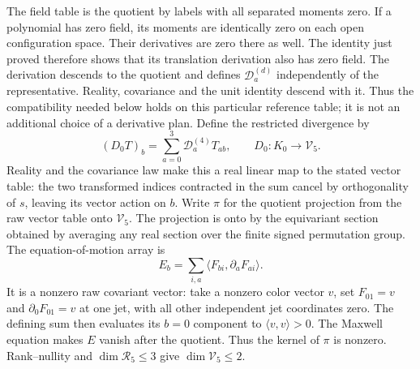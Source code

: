 The field table is the quotient by labels with all separated moments
zero. If a polynomial has zero field, its moments are identically zero
on each open configuration space. Their derivatives are zero there as
well. The identity just proved therefore shows that its translation
derivation also has zero field. The derivation descends to the quotient
and defines $\mathscr D_a^{(d)}$ independently of the representative.
Reality, covariance and the unit identity descend with it. Thus the
compatibility needed below holds on this particular reference table;
it is not an additional choice of a derivative plan. Define the restricted divergence by
\[
 (D_0T)_b=\sum_{a=0}^3\mathscr D_a^{(4)}T_{ab},
 \qquad D_0:K_0\longrightarrow\mathcal V_5.
\]
Reality and the covariance law make this a real linear map to the stated
vector table: the two transformed indices contracted in the sum cancel
by orthogonality of $s$, leaving its vector action on $b$.
Write $\pi$ for the
quotient projection from the raw vector table onto $\mathcal V_5$. The projection is onto by the equivariant
section obtained by averaging any real section over the finite signed
permutation group. The equation-of-motion array is
\[
 E_b=\sum_{i,a}\langle F_{bi},\partial_aF_{ai}\rangle.
\]
It is a nonzero raw covariant vector: take a nonzero color vector $v$, set
$F_{01}=v$ and $\partial_0F_{01}=v$ at one jet, with all other independent
jet coordinates zero. The defining sum then evaluates its $b=0$ component
to $\langle v,v\rangle>0$. The Maxwell equation makes $E$ vanish after the
quotient. Thus the kernel of $\pi$ is nonzero. Rank--nullity and
$\dim\mathcal R_5\le3$ give $\dim\mathcal V_5\le2$.


